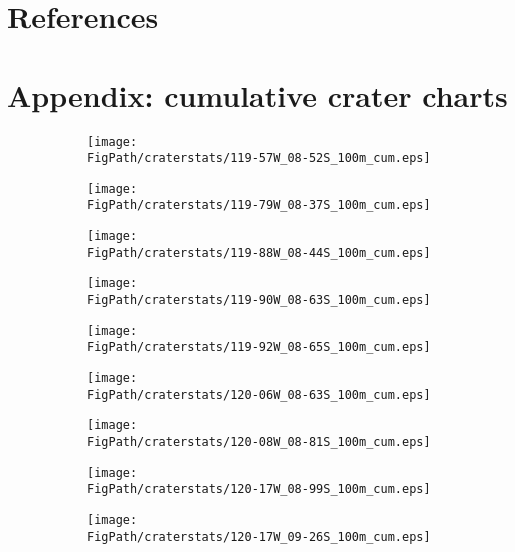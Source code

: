 %
%

\section{References}

\section{Appendix: cumulative crater charts}\label{sec_cccharts}
\begin{figure}[h]
\centering
\begin{subfigure}{.33\textwidth}
  \texttt{[image: \\FigPath/craterstats/119-57W\_08-52S\_100m\_cum.eps]}
\end{subfigure}%
\begin{subfigure}{.33\textwidth}
  \texttt{[image: \\FigPath/craterstats/119-79W\_08-37S\_100m\_cum.eps]}
\end{subfigure}
\begin{subfigure}{.33\textwidth}
  \texttt{[image: \\FigPath/craterstats/119-88W\_08-44S\_100m\_cum.eps]}
\end{subfigure}
\begin{subfigure}{.33\textwidth}
  \texttt{[image: \\FigPath/craterstats/119-90W\_08-63S\_100m\_cum.eps]}
\end{subfigure}%
\begin{subfigure}{.33\textwidth}
  \texttt{[image: \\FigPath/craterstats/119-92W\_08-65S\_100m\_cum.eps]}
\end{subfigure}
\begin{subfigure}{.33\textwidth}
  \texttt{[image: \\FigPath/craterstats/120-06W\_08-63S\_100m\_cum.eps]}
\end{subfigure}
\begin{subfigure}{.33\textwidth}
  \texttt{[image: \\FigPath/craterstats/120-08W\_08-81S\_100m\_cum.eps]}
\end{subfigure}%
\begin{subfigure}{.33\textwidth}
  \texttt{[image: \\FigPath/craterstats/120-17W\_08-99S\_100m\_cum.eps]}
\end{subfigure}
\begin{subfigure}{.33\textwidth}
  \texttt{[image: \\FigPath/craterstats/120-17W\_09-26S\_100m\_cum.eps]}
\end{subfigure}
\end{figure}


